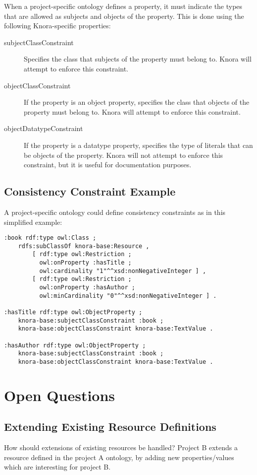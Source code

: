 \documentclass[12pt, a4paper]{article}
\begin{document}
\label{subsec:property-restrictions}

When a project-specific ontology defines a property, it must indicate the types that are allowed as subjects and objects of the property. This is done using the following Knora-specific properties:

\begin{description}
	\item[subjectClassConstraint] Specifies the class that subjects of the property must belong to. Knora will attempt to enforce this constraint.
	\item[objectClassConstraint] If the property is an object property, specifies the class that objects of the property must belong to. Knora will attempt to enforce this constraint.
	\item[objectDatatypeConstraint] If the property is a datatype property, specifies the type of literals that can be objects of the property. Knora will not attempt to enforce this constraint, but it is useful for documentation purposes.
\end{description}

\subsection{Consistency Constraint Example}

A project-specific ontology could define consistency constraints as in this simplified example:

\begin{verbatim}
:book rdf:type owl:Class ;
    rdfs:subClassOf knora-base:Resource ,
        [ rdf:type owl:Restriction ;
          owl:onProperty :hasTitle ;
          owl:cardinality "1"^^xsd:nonNegativeInteger ] ,
        [ rdf:type owl:Restriction ;
          owl:onProperty :hasAuthor ;
          owl:minCardinality "0"^^xsd:nonNegativeInteger ] .

:hasTitle rdf:type owl:ObjectProperty ;
    knora-base:subjectClassConstraint :book ;
    knora-base:objectClassConstraint knora-base:TextValue .

:hasAuthor rdf:type owl:ObjectProperty ;
    knora-base:subjectClassConstraint :book ;
    knora-base:objectClassConstraint knora-base:TextValue .
\end{verbatim}

\section{Open Questions}

\subsection{Extending Existing Resource Definitions}

How should extensions of existing resources be handled? Project B extends a resource defined in the project A ontology, by adding new properties/values which are interesting for project B.

\printbibliography
\end{document}
